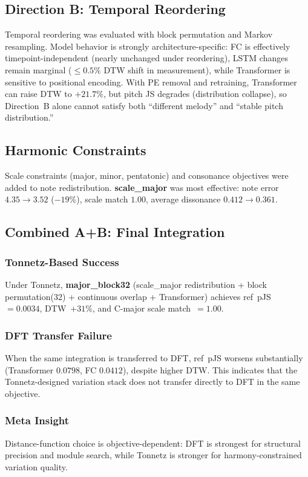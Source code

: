 \documentclass[conference,10pt,a4paper]{IEEEtran}
\begin{document}
\subsection{Direction B: Temporal Reordering}
\label{subsec:dirB}

Temporal reordering was evaluated with block permutation and Markov
resampling. Model behavior is strongly architecture-specific:
FC is effectively timepoint-independent (nearly unchanged under
reordering), LSTM changes remain marginal ($\le 0.5\%$ DTW shift in
measurement), while Transformer is sensitive to positional encoding.
With PE removal and retraining, Transformer can raise DTW to
$+21.7\%$, but pitch JS degrades (distribution collapse), so Direction~B
alone cannot satisfy both ``different melody'' and ``stable pitch
distribution.''

\subsection{Harmonic Constraints}
\label{subsec:harmony}

Scale constraints (major, minor, pentatonic) and consonance objectives
were added to note redistribution.  \textbf{scale\_major} was most
effective: note error $4.35 \to 3.52$ ($-19\%$), scale match $1.00$,
average dissonance $0.412 \to 0.361$.

\subsection{Combined A+B: Final Integration}
\label{subsec:combined}

\subsubsection{Tonnetz-Based Success}
Under Tonnetz, \textbf{major\_block32}
(scale\_major redistribution + block permutation(32) +
continuous overlap + Transformer) achieves
ref~pJS~$=0.0034$, DTW~$+31\%$, and C-major scale match~$=1.00$.

\subsubsection{DFT Transfer Failure}
When the same integration is transferred to DFT, ref~pJS worsens
substantially (Transformer $0.0798$, FC $0.0412$), despite higher DTW.
This indicates that the Tonnetz-designed variation stack does not
transfer directly to DFT in the same objective.

\subsubsection{Meta Insight}
Distance-function choice is objective-dependent:
DFT is strongest for structural precision and module search, while
Tonnetz is stronger for harmony-constrained variation quality.
\end{document}
